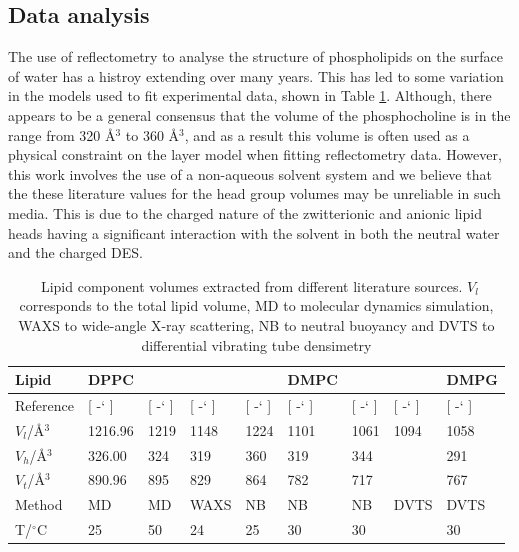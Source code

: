 \documentclass[twoside,twocolumn,9pt]{article}
\newcommand*{\citen}[1]{%
	\begingroup
	\romannumeral-`\x %
	\setcitestyle{numbers}%
	\cite{#1}%
	\endgroup   
}
\begin{document}
\subsection{Data analysis}
The use of reflectometry to analyse the structure of phospholipids on the surface of water has a histroy extending over many years.\cite{Mohwald1990,Kewalramani2010,Bayerl1990,Johnson1991,Clifton2012,Helm1987,Daillant1990} This has led to some variation in the models used to fit experimental data, shown in Table \ref{tab:water}. Although, there appears to be a general consensus that the volume of the phosphocholine is in the range from 320 \AA$^3$ to 360 \AA$^3$, and as a result this volume is often used as a physical constraint on the layer model when fitting reflectometry data. However, this work involves the use of a non-aqueous solvent system and we believe that the these literature values for the head group volumes may be unreliable in such media. This is due to the charged nature of the zwitterionic and anionic lipid heads having a significant interaction with the solvent in both the neutral water and the charged DES. 

\begin{table}
	\small
	\caption{\ Lipid component volumes extracted from different literature sources. $V_l$ corresponds to the total lipid volume, MD to molecular dynamics simulation, WAXS to wide-angle X-ray scattering, NB to neutral buoyancy and DVTS to differential vibrating tube densimetry}
	\label{tab:water}
	\begin{tabular*}{\textwidth}{@{\extracolsep{\fill}}lllllllll}
		\hline 
		Lipid & DPPC & & & & DMPC & & & DMPG \\
		\hline
		Reference & [\citen{Armen1998}] & [\citen{Petrache1997}] & [\citen{Sun1994}] & [\citen{Tardieu1973}] & [\citen{Kucerka2004}] & [\citen{Nagle1978}] & [\citen{Schmidt1985}] & [\citen{Pan2012}] \\
		$V_l$/\AA$^3$ &1216.96 & 1219 & 1148 & 1224 & 1101 & 1061 & 1094 & 1058 \\
		$V_h$/\AA$^3$ & 326.00 & 324 & 319 & 360 & 319 & 344 & & 291 \\
		$V_t$/\AA$^3$ & 890.96 & 895 & 829 & 864 & 782 & 717 & & 767 \\
		Method & MD & MD & WAXS & NB & NB & NB & DVTS & DVTS \\
		T/$^\circ$C & 25 & 50 & 24 & 25 & 30 & 30 & & 30 \\
		\hline
	\end{tabular*}
\end{table}
\end{document}

